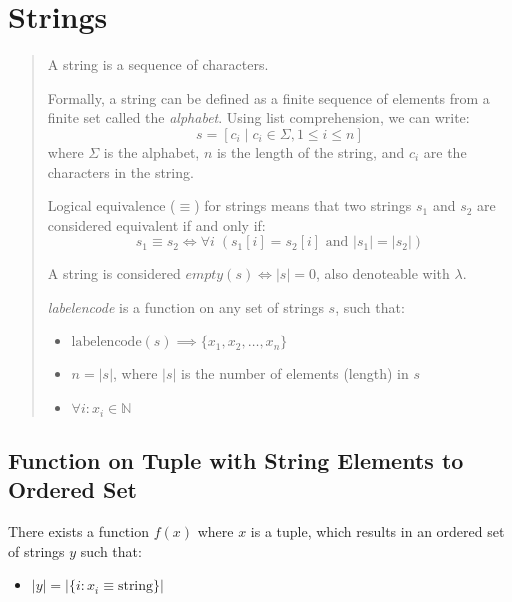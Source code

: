 \section{Strings}

\begin{quote}
A string is a sequence of characters.

Formally, a string can be defined as a finite sequence of elements from a finite set called the \emph{alphabet}. Using list comprehension, we can write:
\[
s = [c_i \mid c_i \in \Sigma, 1 \leq i \leq n]
\]
where $\Sigma$ is the alphabet, $n$ is the length of the string, and $c_i$ are the characters in the string.

Logical equivalence ($\equiv$) for strings means that two strings $s_1$ and $s_2$ are considered equivalent if and only if:
\[
s_1 \equiv s_2 \iff \forall i \; (s_1[i] = s_2[i] \text{ and } |s_1| = |s_2|)
\]

A string is considered $empty(s) \iff |s| = 0$, also denoteable with $\lambda$.

\emph{labelencode} is a function on any set of strings $s$, such that:
\begin{itemize}
    \item $\text{labelencode}(s) \implies \{ x_1, x_2, \ldots, x_n \}$
    \item $n = |s|$, where $|s|$ is the number of elements (length) in $s$
    \item $\forall i : x_i \in \mathbb{N}$
\end{itemize}
\end{quote}

\subsection{Function on Tuple with String Elements to Ordered Set}

There exists a function $f(x)$ where $x$ is a tuple, which results in an ordered set of strings $y$ such that:
\begin{itemize}
    \item $|y| = |\{ i : x_i \equiv \text{string} \}|$
\end{itemize}